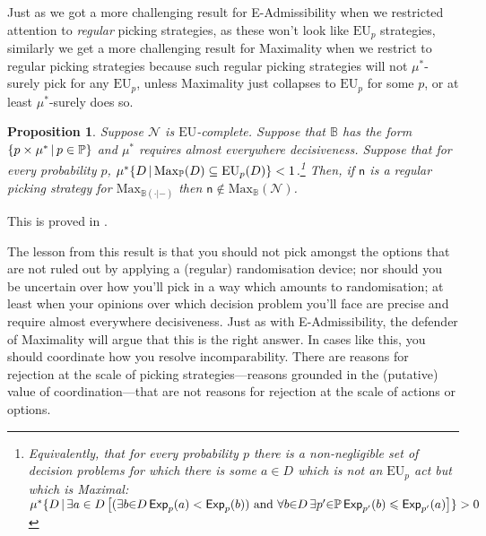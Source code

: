 \documentclass[a4paper]{article}
\newtheorem{proposition}[theorem]{Proposition}
\renewcommand\P{\mathbb{P}} %
\newcommand\Exp{\mathsf{Exp}}
\newcommand\EU{\mathrm{EU}}
\newcommand\Maximality{\mathrm{Max}}
\newcommand{\n}{\mathsf{n}}
\newcommand\Nu{\mathcal{N}}
\newcommand{\IB}{\mathbb{B}}
\newcommand{\IP}{\P}
\renewcommand{\color}[1]{}
\newenvironment{colored}[1]{\leavevmode\color{#1}}{}
\newcommand\SetDelimiter[1][]{
	\nonscript\,#1\vert \allowbreak \nonscript\,\mathopen{}}
\providecommand\given{\SetDelimiter}
\renewcommand{\leq}{\leqslant}
\newenvironment{CCM rewritten}
{\begingroup\color{blue}} %
{\endgroup}              %
\begin{document}

	

Just as we got a more challenging result for E-Admissibility when we restricted attention to \emph{regular} picking strategies, as these won't look like $\EU_p$ strategies, similarly we get a more challenging result for Maximality when we restrict to regular picking strategies because such regular picking strategies will not $\mu^*$-surely pick for any $\EU_p$, unless Maximality just collapses to $\EU_p$ for some $p$, or at least $\mu^*$-surely does so.


\begin{proposition}\label{thm:max-nu-reg-nec}
	Suppose $\Nu$ is $\EU$-complete. 
	Suppose that $\IB$ has the form $\{p\times \mu^*\given p\in \IP\}$ and $\mu^*$ requires almost everywhere decisiveness. Suppose that for every probability $p$, $\mu^*\{D\given \Maximality_\IP(D)\subseteq\EU_p(D)\}< 1$.\footnote{Equivalently, that for every probability $p$ there is a non-negligible set of decision problems for which there is some $a\in D$ which is not an $\EU_p$ act but which is Maximal: $\mu^*\{D\given \exists a\in D\left[(\exists b{\in} D \, \Exp_{p}(a)<\Exp_{p}(b))\text{ and }\forall b{\in} D\, \exists p'{\in}\IP \,\Exp_{p'}(b)\leq \Exp_{p'}(a)\right]\}>0$} %
	Then, if $\n$ is a regular picking strategy for $\Maximality_{\IB(\cdot|-)}$ then $\n\notin \Maximality_\IB(\Nu)$.%
\end{proposition}
This is proved in .


	The lesson from this result is that you should not pick amongst the options that are not ruled out by applying a (regular) randomisation device; nor should you be uncertain over how you'll pick in a way which amounts to randomisation; at least when your opinions over which decision problem you'll face are precise and require almost everywhere decisiveness. 
	Just as with E-Admissibility, the defender of Maximality will argue that this is the right answer. In cases like this, you should coordinate how you resolve incomparability. There are reasons for rejection at the scale of picking strategies---reasons grounded in the (putative) value of coordination---that are not reasons for rejection at the scale of actions or options. 
	
\end{document}
